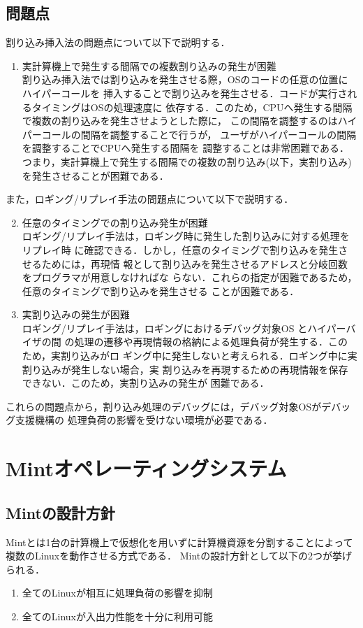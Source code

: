 \documentclass[tanilab-enum]{graduate}
\begin{document}
\section{問題点}
割り込み挿入法の問題点について以下で説明する．
\begin{enumerate}
    \item 実計算機上で発生する間隔での複数割り込みの発生が困難\\
        割り込み挿入法では割り込みを発生させる際，OSのコードの任意の位置にハイパーコールを
        挿入することで割り込みを発生させる．コードが実行されるタイミングはOSの処理速度に
        依存する．このため，CPUへ発生する間隔で複数の割り込みを発生させようとした際に，
        この間隔を調整するのはハイパーコールの間隔を調整することで行うが，
        ユーザがハイパーコールの間隔を調整することでCPUへ発生する間隔を
        調整することは非常困難である．
        つまり，実計算機上で発生する間隔での複数の割り込み(以下，実割り込み)
        を発生させることが困難である．
\end{enumerate}
また，ロギング/リプレイ手法の問題点について以下で説明する．
\begin{enumerate}
\setcounter{enumi}{1}
    \item 任意のタイミングでの割り込み発生が困難\\
        ロギング/リプレイ手法は，ロギング時に発生した割り込みに対する処理をリプレイ時
        に確認できる．しかし，任意のタイミングで割り込みを発生させるためには，再現情
        報として割り込みを発生させるアドレスと分岐回数をプログラマが用意しなければな
        らない．これらの指定が困難であるため，任意のタイミングで割り込みを発生させる
        ことが困難である．
    \item 実割り込みの発生が困難\\
        ロギング/リプレイ手法は，ロギングにおけるデバッグ対象OS とハイパーバイザの間
        の処理の遷移や再現情報の格納による処理負荷が発生する．このため，実割り込みがロ
        ギング中に発生しないと考えられる．ロギング中に実割り込みが発生しない場合，実
        割り込みを再現するための再現情報を保存できない．このため，実割り込みの発生が
        困難である．
\end{enumerate}
これらの問題点から，割り込み処理のデバッグには，デバッグ対象OSがデバッグ支援機構の
処理負荷の影響を受けない環境が必要である．
\chapter{Mintオペレーティングシステム}\label{chap:Mint}
\section{Mintの設計方針}
Mintとは1台の計算機上で仮想化を用いずに計算機資源を分割することによって
複数のLinuxを動作させる方式である．
Mintの設計方針として以下の2つが挙げられる．
\begin{enumerate}
    \item 全てのLinuxが相互に処理負荷の影響を抑制
    \item 全てのLinuxが入出力性能を十分に利用可能
\end{enumerate}
\end{document}
